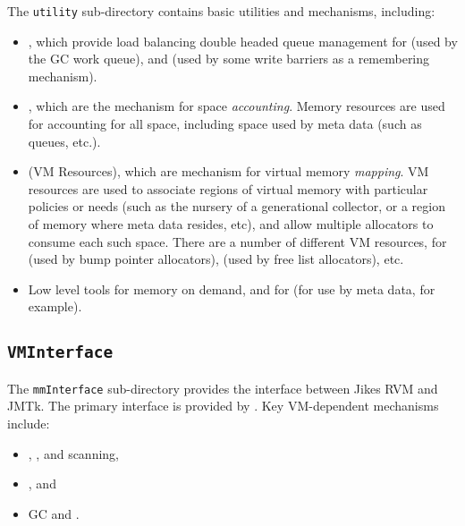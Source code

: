 The \texttt{utility} sub-directory contains basic utilities and
mechanisms, including:
\begin{itemize}
\item {}, which provide load balancing double
  headed queue management for  (used by the GC work queue), and
   (used by some write
  barriers as a remembering mechanism).
\item {}, which are the
  mechanism for space \emph{accounting}.  Memory resources are used
  for accounting for all space, including space used by meta data
  (such as queues, etc.).
\item {} (VM
  Resources), which are mechanism for virtual memory \emph{mapping}.
  VM resources are used to associate regions of virtual memory with
  particular policies or needs (such as the nursery of a generational
  collector, or a region of memory where meta data resides, etc), and
  allow multiple allocators to consume each such space. There are a
  number of different VM resources, for  (used by bump pointer
  allocators), 
  (used by free list allocators), etc.
\item Low level tools for 
  memory on demand, and for  (for use by meta data, for example).
\end{itemize}

\subsection{\texttt{VMInterface}} \label{sssec:vminterface}

The \texttt{mmInterface} sub-directory provides the interface between
Jikes RVM and JMTk.  The primary interface is provided by
.  Key
VM-dependent mechanisms include:

\begin{itemize}
\item {},
  , and
   scanning,
\item {}, and
\item GC  and .
\end{itemize}

